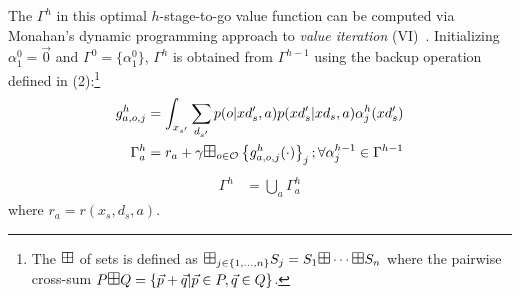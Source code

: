 \documentclass{article} %
\begin{document}
The $\Gamma^h$ in this optimal $h$-stage-to-go value function can be
computed via Monahan's dynamic programming approach to \emph{value
iteration} (VI)~\cite{monahan82}.  
Initializing  $\alpha^0_1 = \vec{0}$ and $\Gamma^0 = \{ \alpha^0_1 \}$, $\Gamma^h$ is obtained from $\Gamma^{h-1}$ using the backup operation defined in (2):\footnote{The $\textrm{\large $\boxplus$}$ of sets is defined as 
$\textrm{\large $\boxplus$}_{j \in \{ 1,\ldots, n \} } S_j = S_1 \textrm{\large $\boxplus$} \cdots \textrm{\large $\boxplus$} S_n$ where the pairwise cross-sum $P 
\textrm{\large $\boxplus$} Q = \{ \vec{p} + \vec{q} | \vec{p} \in P, \vec{q} \in Q \}$.}
{\footnotesize
\begin{align} 
g^h_{a,o,j} &=  \int_{x_{s'}} \sum_{d_{s'}} p(o|xd'_s,a)p(xd'_s|xd_s,a) \alpha^h_j(xd'_s) \label{eq:backup} \\
\Gamma^{h}_a   &= r_a + \gamma \textrm{\large $\boxplus$}_{o \in \mathcal{O}} \left\{ g^h_{a,o,j}(\cdot) \right\}_j ;  \forall \alpha^{h-1}_{j} \in \Gamma^{h-1}  \label{eq:cross_prod} 
\end{align}
\begin{align}
\Gamma^h  &= \bigcup_a \Gamma^h_a 
\end{align}
}
\vspace{-3mm}
where $r_a = r(x_s,d_s,a)$.
\vspace{2mm}
\end{document}

